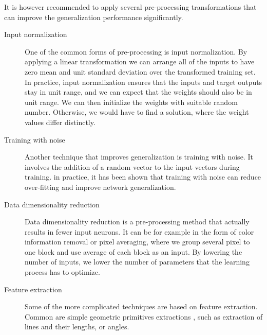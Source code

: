 It is however recommended to apply several pre-processing transformations that can improve the generalization performance significantly.
\begin{description}
\item [Input normalization]
One of the common forms of pre-processing is input normalization. By applying a linear transformation we can arrange all of the inputs to have zero mean and unit standard deviation over the transformed training set.
In practice, input normalization ensures that the inputs and target outputs stay in unit range, and we can expect that the weights should also be in unit range. We can then initialize the weights with suitable random number. Otherwise, we would have to find a solution, where the weight values differ distinctly.
\item [Training with noise]
Another technique that improves generalization  is training with noise. It involves the addition of a random vector to the input vectors during training. in practice, it has been shown that training with noise can reduce over-fitting and improve network generalization. 
\item [Data dimensionality reduction]
Data dimensionality reduction is a pre-processing method that actually results  in fewer input neurons. It can be for example in the form  of color information removal or pixel averaging, where we group several pixel to one block and use average of each block as an input. By lowering the number of inputs, we lower the number of parameters that the learning process has to optimize.
\item [Feature extraction]
Some of the more complicated techniques are based on  feature extraction. Common are simple geometric primitives extractions , such as extraction of lines and their lengths, or angles. 
\end{description}
